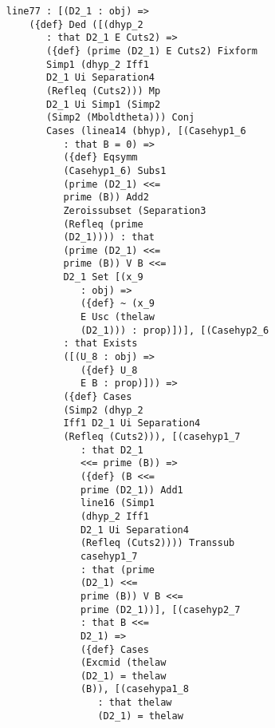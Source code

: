 \documentclass[12pt]{article}
\begin{document}
\begin{verbatim}
                  line77 : [(D2_1 : obj) => 
                      ({def} Ded ([(dhyp_2 
                         : that D2_1 E Cuts2) => 
                         ({def} (prime (D2_1) E Cuts2) Fixform 
                         Simp1 (dhyp_2 Iff1 
                         D2_1 Ui Separation4 
                         (Refleq (Cuts2))) Mp 
                         D2_1 Ui Simp1 (Simp2 
                         (Simp2 (Mboldtheta))) Conj 
                         Cases (linea14 (bhyp), [(Casehyp1_6 
                            : that B = 0) => 
                            ({def} Eqsymm 
                            (Casehyp1_6) Subs1 
                            (prime (D2_1) <<= 
                            prime (B)) Add2 
                            Zeroissubset (Separation3 
                            (Refleq (prime 
                            (D2_1)))) : that 
                            (prime (D2_1) <<= 
                            prime (B)) V B <<= 
                            D2_1 Set [(x_9 
                               : obj) => 
                               ({def} ~ (x_9 
                               E Usc (thelaw 
                               (D2_1))) : prop)])], [(Casehyp2_6 
                            : that Exists 
                            ([(U_8 : obj) => 
                               ({def} U_8 
                               E B : prop)])) => 
                            ({def} Cases 
                            (Simp2 (dhyp_2 
                            Iff1 D2_1 Ui Separation4 
                            (Refleq (Cuts2))), [(casehyp1_7 
                               : that D2_1 
                               <<= prime (B)) => 
                               ({def} (B <<= 
                               prime (D2_1)) Add1 
                               line16 (Simp1 
                               (dhyp_2 Iff1 
                               D2_1 Ui Separation4 
                               (Refleq (Cuts2)))) Transsub 
                               casehyp1_7 
                               : that (prime 
                               (D2_1) <<= 
                               prime (B)) V B <<= 
                               prime (D2_1))], [(casehyp2_7 
                               : that B <<= 
                               D2_1) => 
                               ({def} Cases 
                               (Excmid (thelaw 
                               (D2_1) = thelaw 
                               (B)), [(casehypa1_8 
                                  : that thelaw 
                                  (D2_1) = thelaw 

\end{verbatim}
\end{document}
